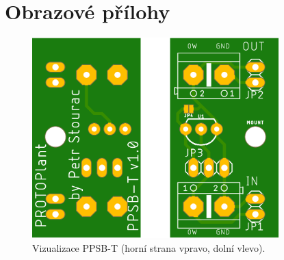 \chapter{Obrazové přílohy}

\begin{figure}[h]
    \centering
    \includegraphics[width=0.85\textwidth]{img/ToBeRemoved/PPSB-T_BOTH.png}
    \caption{Vizualizace PPSB-T (horní strana vpravo, dolní vlevo).}
    \label{fig:PPSB-T_VISUAL}
\end{figure}